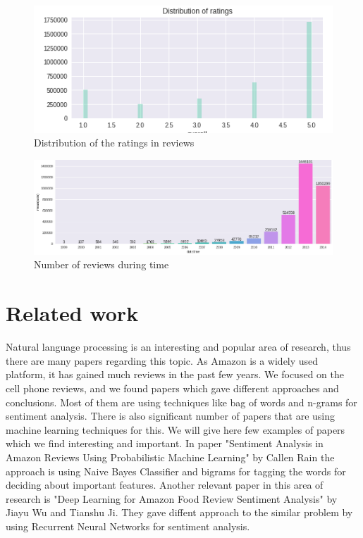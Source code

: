 \documentclass[11pt]{article}
\begin{document}
\begin{figure}[h!]
  \centering
    \includegraphics[width=\linewidth]{ratingDistribution.png}
  \caption{Distribution of the ratings in reviews}
  \label{fig:ratingDistribution}
\end{figure}


\begin{figure}[h!]
  \centering
    \includegraphics[width=\linewidth]{reviewsByTime.png}
  \caption{Number of reviews during time}
  \label{fig:reviewsByTime}
\end{figure}


\section{Related work}
Natural language processing is an interesting and popular area of research, thus there are many papers regarding this topic. As Amazon is a widely used platform, it has gained much reviews in the past few years. We focused on the cell phone reviews, and we found papers which gave different approaches and conclusions. Most of them are using techniques like bag of words and n-grams for sentiment analysis. There is also significant number of papers that are using machine learning techniques for this. We will give here few examples of papers which we find interesting and important. In paper "Sentiment Analysis in Amazon Reviews Using Probabilistic Machine Learning" by Callen Rain the approach is using Naive Bayes Classifier and bigrams for tagging the words for deciding about important features. Another relevant paper in this area of research is "Deep Learning for Amazon Food Review Sentiment Analysis" by Jiayu Wu and Tianshu Ji. They gave diffent approach to the similar problem by using Recurrent Neural Networks for sentiment analysis. 
\end{document}
